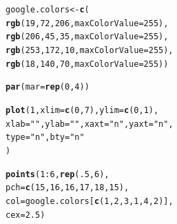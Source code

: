 \documentclass{tufte-book}\usepackage[]{graphicx}\usepackage[]{color}
\makeatletter
\newcommand{\hlnum}[1]{\textcolor[rgb]{0.686,0.059,0.569}{#1}}%
\newcommand{\hlstr}[1]{\textcolor[rgb]{0.192,0.494,0.8}{#1}}%
\newcommand{\hlopt}[1]{\textcolor[rgb]{0,0,0}{#1}}%
\newcommand{\hlstd}[1]{\textcolor[rgb]{0.345,0.345,0.345}{#1}}%
\newcommand{\hlkwb}[1]{\textcolor[rgb]{0.69,0.353,0.396}{#1}}%
\newcommand{\hlkwc}[1]{\textcolor[rgb]{0.333,0.667,0.333}{#1}}%
\newcommand{\hlkwd}[1]{\textcolor[rgb]{0.737,0.353,0.396}{\textbf{#1}}}%
\newenvironment{kframe}{%
 \def\at@end@of@kframe{}%
 \ifinner\ifhmode%
  \def\at@end@of@kframe{\end{minipage}}%
  \begin{minipage}{\columnwidth}%
 \fi\fi%
 \def\FrameCommand##1{\hskip\@totalleftmargin \hskip-\fboxsep
 \colorbox{shadecolor}{##1}\hskip-\fboxsep
     \hskip-\linewidth \hskip-\@totalleftmargin \hskip\columnwidth}%
 \MakeFramed {\advance\hsize-\width
   \@totalleftmargin\z@ \linewidth\hsize
   \@setminipage}}%
 {\par\unskip\endMakeFramed%
 \at@end@of@kframe}
\newenvironment{knitrout}{}{} %
\makeatother
\begin{document}
\begin{marginfigure}
\begin{tiny}
\begin{knitrout}
\color{fgcolor}\begin{kframe}
\begin{alltt}
\hlstd{google.colors} \hlkwb{<-} \hlkwd{c}\hlstd{(}
  \hlkwd{rgb}\hlstd{(}\hlnum{19}\hlstd{,} \hlnum{72}\hlstd{,} \hlnum{206}\hlstd{,} \hlkwc{maxColorValue} \hlstd{=} \hlnum{255}\hlstd{),}
  \hlkwd{rgb}\hlstd{(}\hlnum{206}\hlstd{,} \hlnum{45}\hlstd{,} \hlnum{35}\hlstd{,} \hlkwc{maxColorValue} \hlstd{=} \hlnum{255}\hlstd{),}
  \hlkwd{rgb}\hlstd{(}\hlnum{253}\hlstd{,} \hlnum{172}\hlstd{,} \hlnum{10}\hlstd{,} \hlkwc{maxColorValue} \hlstd{=} \hlnum{255}\hlstd{),}
  \hlkwd{rgb}\hlstd{(}\hlnum{18}\hlstd{,} \hlnum{140}\hlstd{,} \hlnum{70}\hlstd{,} \hlkwc{maxColorValue} \hlstd{=} \hlnum{255}\hlstd{))}

\hlkwd{par}\hlstd{(}\hlkwc{mar} \hlstd{=} \hlkwd{rep}\hlstd{(}\hlnum{0}\hlstd{,} \hlnum{4}\hlstd{))}

\hlkwd{plot}\hlstd{(}\hlnum{1}\hlstd{,} \hlkwc{xlim} \hlstd{=} \hlkwd{c}\hlstd{(}\hlnum{0}\hlstd{,} \hlnum{7}\hlstd{),} \hlkwc{ylim} \hlstd{=} \hlkwd{c}\hlstd{(}\hlnum{0}\hlstd{,} \hlnum{1}\hlstd{),}
     \hlkwc{xlab} \hlstd{=} \hlstr{""}\hlstd{,} \hlkwc{ylab} \hlstd{=} \hlstr{""}\hlstd{,} \hlkwc{xaxt} \hlstd{=} \hlstr{"n"}\hlstd{,} \hlkwc{yaxt} \hlstd{=} \hlstr{"n"}\hlstd{,}
     \hlkwc{type} \hlstd{=} \hlstr{"n"}\hlstd{,} \hlkwc{bty} \hlstd{=} \hlstr{"n"}
     \hlstd{)}

\hlkwd{points}\hlstd{(}\hlnum{1}\hlopt{:}\hlnum{6}\hlstd{,} \hlkwd{rep}\hlstd{(}\hlnum{.5}\hlstd{,} \hlnum{6}\hlstd{),}
       \hlkwc{pch} \hlstd{=} \hlkwd{c}\hlstd{(}\hlnum{15}\hlstd{,} \hlnum{16}\hlstd{,} \hlnum{16}\hlstd{,} \hlnum{17}\hlstd{,} \hlnum{18}\hlstd{,} \hlnum{15}\hlstd{),}
       \hlkwc{col} \hlstd{= google.colors[}\hlkwd{c}\hlstd{(}\hlnum{1}\hlstd{,} \hlnum{2}\hlstd{,} \hlnum{3}\hlstd{,} \hlnum{1}\hlstd{,} \hlnum{4}\hlstd{,} \hlnum{2}\hlstd{)],}
       \hlkwc{cex} \hlstd{=} \hlnum{2.5}\hlstd{)}


\end{alltt}
\end{kframe}
\end{knitrout}
\end{tiny}
\end{marginfigure}
\end{document}
